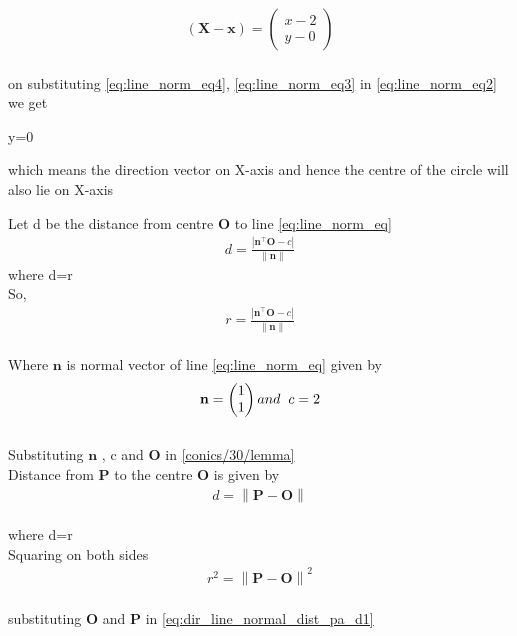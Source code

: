 \documentclass[10pt,a4paper]{report}
\newcommand{\myvec}[1]{\ensuremath{\begin{pmatrix}#1\end{pmatrix}}}
\let\vec\mathbf
\providecommand{\norm}[1]{\left\lVert#1\right\rVert}
\providecommand{\abs}[1]{\left\vert#1\right\vert}
\let\vec\mathbf
\begin{document}
\begin{multicols}{2}
\begin{align}
  \label{eq:line_norm_eq4}
(\vec{X}-\vec{x})=\myvec{x-2\\
y-0}
\end{align} \\
on substituting \eqref{eq:line_norm_eq4}, \eqref{eq:line_norm_eq3} in \eqref{eq:line_norm_eq2} we get\\
\begin{center}
y=0
\end{center}
which means the direction vector on X-axis and hence the centre of the circle will also lie on X-axis\\
\vspace{5mm}



 Let d be the distance from centre $\vec{O}$ to line \eqref{eq:line_norm_eq}\\
 \begin{align}
  \label{conics/30/lemma}
	d = \frac{\abs{   \vec{n}^{\top}\vec{O}-c }}{\norm{\vec{n}}}	
\end{align}
where d=r\\
So, \begin{align}
  \label{conics/30/lemma}
	r = \frac{\abs{   \vec{n}^{\top}\vec{O}-c }}{\norm{\vec{n}}}	
\end{align}\\
Where $\vec{n}$ is normal vector of line \eqref{eq:line_norm_eq} given by\\
\begin{align}
\vec{n}=\myvec{1 \\
1} and \hspace{2mm} c=2
\end{align}\\
Substituting $\vec{n}$ , c and $\vec{O}$ in \eqref{conics/30/lemma} \\
\vspace{5mm}
Distance from $\vec{P}$ to the centre $\vec{O}$ is given by\\
\begin{align}
d = 	\norm{\vec{P}-\vec{O}}
	\label{eq:dir_line_normal_dist_pa_d}
\end{align}\\where d=r\\
Squaring on both sides\\
\begin{align}
\label{eq:dir_line_normal_dist_pa_d1}
r^2 = 	\norm{\vec{P}-\vec{O}}^2
\end{align}\\
substituting $\vec{O}$ and $\vec{P}$ in \eqref{eq:dir_line_normal_dist_pa_d1} \\


\end{multicols}
\end{document}
